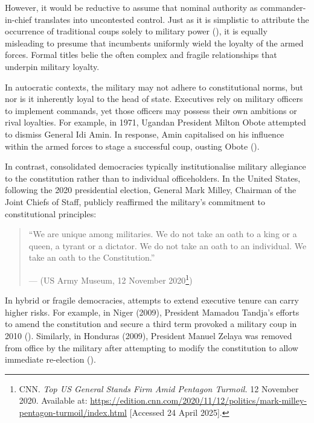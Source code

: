 \documentclass[
  12pt,
]{report}
\begin{document}
However, it would be reductive to assume that nominal authority as
commander-in-chief translates into uncontested control. Just as it is
simplistic to attribute the occurrence of traditional coups solely to
military power (), it is equally
misleading to presume that incumbents uniformly wield the loyalty of the
armed forces. Formal titles belie the often complex and fragile
relationships that underpin military loyalty.

In autocratic contexts, the military may not adhere to constitutional
norms, but nor is it inherently loyal to the head of state. Executives
rely on military officers to implement commands, yet those officers may
possess their own ambitions or rival loyalties. For example, in 1971,
Ugandan President Milton Obote attempted to dismiss General Idi Amin. In
response, Amin capitalised on his influence within the armed forces to
stage a successful coup, ousting Obote
().

In contrast, consolidated democracies typically institutionalise
military allegiance to the constitution rather than to individual
officeholders. In the United States, following the 2020 presidential
election, General Mark Milley, Chairman of the Joint Chiefs of Staff,
publicly reaffirmed the military's commitment to constitutional
principles:

\begin{quote}
``We are unique among militaries. We do not take an oath to a king or a
queen, a tyrant or a dictator. We do not take an oath to an individual.
We take an oath to the Constitution.''

--- (US Army Museum, 12 November 2020\footnote{CNN. \emph{Top US General
  Stands Firm Amid Pentagon Turmoil.} 12 November 2020. Available at:
  \url{https://edition.cnn.com/2020/11/12/politics/mark-milley-pentagon-turmoil/index.html}
  {[}Accessed 24 April 2025{]}.})
\end{quote}

In hybrid or fragile democracies, attempts to extend executive tenure
can carry higher risks. For example, in Niger (2009), President Mamadou
Tandja's efforts to amend the constitution and secure a third term
provoked a military coup in 2010 (). Similarly, in Honduras (2009), President Manuel Zelaya was
removed from office by the military after attempting to modify the
constitution to allow immediate re-election
().
\end{document}
